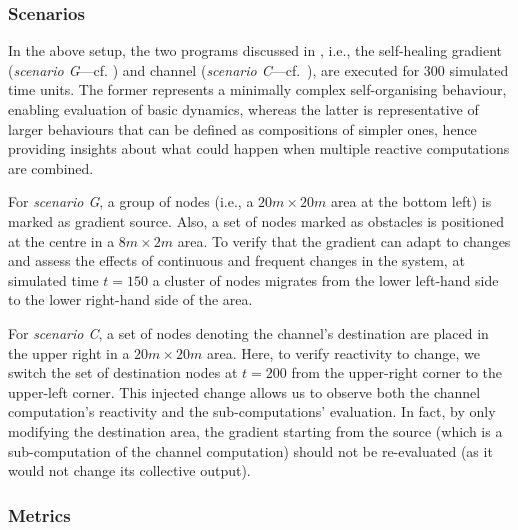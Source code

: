 \subsubsection{Scenarios}

In the above setup, the two programs discussed in ,
 i.e., the self-healing gradient (\emph{scenario G}---cf. ) and channel (\emph{scenario C}---cf.~),
 are executed for 300 simulated time units. 
%
The former represents a minimally complex self-organising behaviour, enabling evaluation of basic dynamics, 
 whereas the latter is representative of larger behaviours that can be defined as compositions of simpler ones, hence 
 providing insights about what could happen when multiple reactive computations are combined.

For \emph{scenario G},
 a group of nodes (i.e., a $20m \times 20m$ area at the bottom left) is marked as gradient source.
%
Also, a set of nodes marked as obstacles is positioned at the centre in a $8m \times 2m$ area.
%
To verify that the gradient can adapt to changes and assess the effects of continuous and frequent changes in the system,
at simulated time $t=150$ a cluster of nodes migrates from the lower left-hand side to the lower right-hand side of the area.

For \emph{scenario C},
 a set of nodes denoting the channel's destination are placed in the upper right in a $20m \times 20m$ area.
 Here, to verify reactivity to change, 
 we switch the set of destination nodes at $t=200$ 
 from the upper-right corner to the upper-left corner. 
This injected change allows us to observe both
 the channel computation's reactivity and the sub-computations' evaluation.
 In fact, by only modifying the destination area, the gradient starting from the source (which is a sub-computation of the channel computation) should not be re-evaluated (as it would not change its collective output).

\subsubsection{Metrics}

